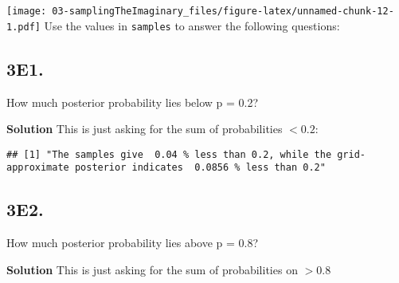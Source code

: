 \documentclass[
]{book}
\newenvironment{Shaded}{\begin{snugshade}}{\end{snugshade}}
\newcommand{\CommentTok}[1]{\textcolor[rgb]{0.56,0.35,0.01}{\textit{#1}}}
\newcommand{\DecValTok}[1]{\textcolor[rgb]{0.00,0.00,0.81}{#1}}
\newcommand{\FloatTok}[1]{\textcolor[rgb]{0.00,0.00,0.81}{#1}}
\newcommand{\KeywordTok}[1]{\textcolor[rgb]{0.13,0.29,0.53}{\textbf{#1}}}
\newcommand{\NormalTok}[1]{#1}
\newcommand{\OperatorTok}[1]{\textcolor[rgb]{0.81,0.36,0.00}{\textbf{#1}}}
\newcommand{\StringTok}[1]{\textcolor[rgb]{0.31,0.60,0.02}{#1}}
\begin{document}
\texttt{[image: 03-samplingTheImaginary\_files/figure-latex/unnamed-chunk-12-1.pdf]}
Use the values in \texttt{samples} to answer the following questions:

\hypertarget{e1.}{%
\subsection{3E1.}\label{e1.}}

How much posterior probability lies below p = 0.2?

\textbf{Solution}
This is just asking for the sum of probabilities \(<0.2\):

\begin{Shaded}
\end{Shaded}

\begin{verbatim}
## [1] "The samples give  0.04 % less than 0.2, while the grid-approximate posterior indicates  0.0856 % less than 0.2"
\end{verbatim}

\hypertarget{e2.}{%
\subsection{3E2.}\label{e2.}}

How much posterior probability lies above p = 0.8?

\textbf{Solution}
This is just asking for the sum of probabilities on \(> 0.8\)
\end{document}
